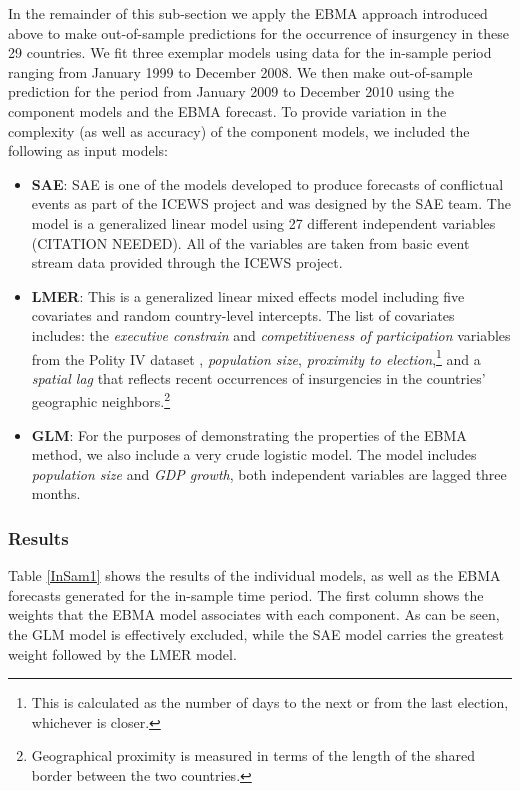 \documentclass[pdftex,12pt,fullpage,oneside]{amsart}
\begin{document}
In the remainder of this sub-section we apply the EBMA approach
introduced above to make out-of-sample predictions for the occurrence
of insurgency in these 29 countries.  We fit three exemplar models
using data for the in-sample period ranging from January 1999 to
December 2008.  We then make out-of-sample prediction for the period
from January 2009 to December 2010 using the component models and the
EBMA forecast.  To provide variation in the complexity (as well as
accuracy) of the component models, we included the following as input models:
\begin{itemize}
\item{\bf{SAE}}: SAE is one of the models developed to produce
  forecasts of conflictual events as part of the ICEWS project and was
  designed by the SAE team. The model is a generalized linear model
  using 27 different independent variables (CITATION NEEDED).  All of
  the variables are taken from basic event stream data provided
  through the ICEWS project. 
\item{\bf{LMER}}: This is a generalized linear mixed effects model
  including five covariates and random country-level intercepts. The
  list of covariates includes: the \textit{executive constrain} and
  \textit{competitiveness of participation} variables from the Polity
  IV dataset \citep{PolityIV}, \textit{population size},
  \textit{proximity to election},\footnote{This is calculated as the
    number of days to the next or from the last election, whichever is
    closer.} and a \textit{spatial lag} that reflects recent
  occurrences of insurgencies in the countries' geographic
  neighbors.\footnote{Geographical proximity is measured in terms of
    the length of the shared border between the two countries.}
\item{\bf{GLM}}: For the purposes of demonstrating the properties of
  the EBMA method, we also include a very crude logistic model.  The
  model includes \textit{population size} and \textit{GDP growth}, both independent variables are lagged three months.
\end{itemize}

\subsubsection{Results}

Table \ref{InSam1} shows the results of the individual models, as well
as the EBMA forecasts generated for the in-sample time period. The
first column shows the weights that the EBMA model associates with
each component. As can be seen, the GLM model is effectively excluded,
while the SAE model carries the greatest weight followed by the LMER
model.
\end{document}
